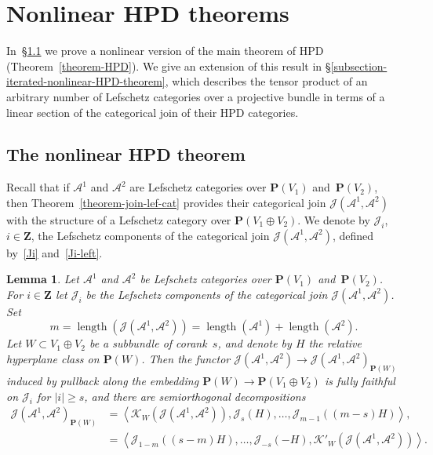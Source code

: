 \documentclass[11pt, reqno]{amsart}
\numberwithin{equation}{section}
\theoremstyle{plain}
\newtheorem{lemma}[theorem]{Lemma}
\theoremstyle{definition}
\DeclareMathOperator{\length}{\mathrm{length}}
\newcommand{\llangle}{\left \langle}
\newcommand{\rrangle}{\right \rangle}
\newcommand{\cA}{\mathcal{A}}
\newcommand{\cJ}{\mathcal{J}}
\newcommand{\cK}{\mathcal{K}}
\newcommand{\bZ}{\mathbf{Z}}
\newcommand{\bP}{\mathbf{P}}
\begin{document}

\section{Nonlinear HPD theorems}
\label{section-nonlinear-HPD}

In~\S\ref{subsection-nonlinear-HPD-theorem} we prove a nonlinear version of the main theorem of HPD (Theorem~\ref{theorem-HPD}).
We give an extension of this result in \S\ref{subsection-iterated-nonlinear-HPD-theorem}, 
which describes the tensor product of an arbitrary number of Lefschetz 
categories over a projective bundle in terms of a linear section of the categorical 
join of their HPD categories. 

\subsection{The nonlinear HPD theorem} 
\label{subsection-nonlinear-HPD-theorem}

Recall that if $\cA^1$ and $\cA^2$ are Lefschetz categories over $\bP(V_1)$ and~$\bP(V_2)$, 
then Theorem~\ref{theorem-join-lef-cat} provides their categorical join $\cJ(\cA^1,\cA^2)$ 
with the structure of a Lefschetz category over $\bP(V_1 \oplus V_2)$.
We denote by $\cJ_i$, $i \in \bZ$, the Lefschetz components of the categorical join $\cJ(\cA^1,\cA^2)$, 
defined by~\eqref{Ji} and~\eqref{Ji-left}.

\begin{lemma}
\label{lemma-cJL-HPD} 
Let $\cA^1$ and $\cA^2$ be Lefschetz categories over $\bP(V_1)$ and~$\bP(V_2)$. 
For $i \in \bZ$ let $\cJ_i$ be the Lefschetz components of the categorical join 
$\cJ(\cA^1, \cA^2)$. 
Set 
\begin{equation*}
m = \length(\cJ(\cA^1,\cA^2)) = \length(\cA^1) + \length(\cA^2). 
\end{equation*}
Let \mbox{$W \subset V_1 \oplus V_2$} be a subbundle of corank~$s$, and denote by $H$ the relative hyperplane class on $\bP(W)$. 
Then the functor $\cJ(\cA^1, \cA^2) \to \cJ(\cA^1, \cA^2)_{\bP(W)}$ induced by pullback 
along the embedding $\bP(W) \to \bP(V_1 \oplus V_2)$ is fully faithful on $\cJ_i$ for $|i| \geq s$, and 
there are semiorthogonal decompositions 
\begin{align*}
\cJ(\cA^1, \cA^2)_{\bP(W)} & = 
\llangle 
\cK_W(\cJ(\cA^1, \cA^2)), \cJ_s(H), \dots, \cJ_{m-1}((m-s)H) 
\rrangle,    
\\ 
& = 
\llangle 
\cJ_{1-m}((s-m)H), \dots, \cJ_{-s}(-H), \cK'_W(\cJ(\cA^1, \cA^2)) 
\rrangle . 
\end{align*} 
\end{lemma}
\end{document}
